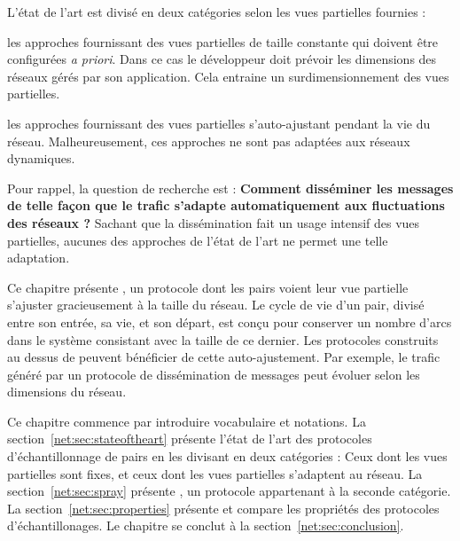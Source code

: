 L'état de l'art est divisé en deux catégories selon les vues partielles fournies :
\begin{inparaenum}
\item les approches fournissant des vues partielles de taille constante qui
  doivent être configurées \emph{a priori}. Dans ce cas le développeur doit
  prévoir les dimensions des réseaux gérés par son application. Cela entraine un
  surdimensionnement des vues partielles.
\item les approches fournissant des vues partielles s'auto-ajustant pendant la
  vie du réseau. Malheureusement, ces approches ne sont pas adaptées aux réseaux
  dynamiques.
\end{inparaenum}

Pour rappel, la question de recherche est : \textbf{Comment disséminer les
  messages de telle façon que le trafic s’adapte automatiquement aux
  fluctuations des réseaux ?}  Sachant que la dissémination fait un usage
intensif des vues partielles, aucunes des approches de l'état de l'art ne permet
une telle adaptation.

Ce chapitre présente \SPRAY, un protocole dont les pairs voient leur vue
partielle s'ajuster gracieusement à la taille du réseau. Le cycle de vie d'un
pair, divisé entre son entrée, sa vie, et son départ, est conçu pour conserver
un nombre d'arcs dans le système consistant avec la taille de ce dernier. Les
protocoles construits au dessus de \SPRAY peuvent bénéficier de cette
auto-ajustement. Par exemple, le trafic généré par un protocole de dissémination
de messages peut évoluer selon les dimensions du réseau.

Ce chapitre commence par introduire vocabulaire et notations. La
section~\ref{net:sec:stateoftheart} présente l'état de l'art des protocoles
d'échantillonnage de pairs en les divisant en deux catégories : Ceux dont les
vues partielles sont fixes, et ceux dont les vues partielles s'adaptent au
réseau. La section~\ref{net:sec:spray} présente \SPRAY, un protocole appartenant
à la seconde catégorie. La section~\ref{net:sec:properties} présente et compare
les propriétés des protocoles d'échantillonages. Le chapitre se conclut à la
section~\ref{net:sec:conclusion}.

